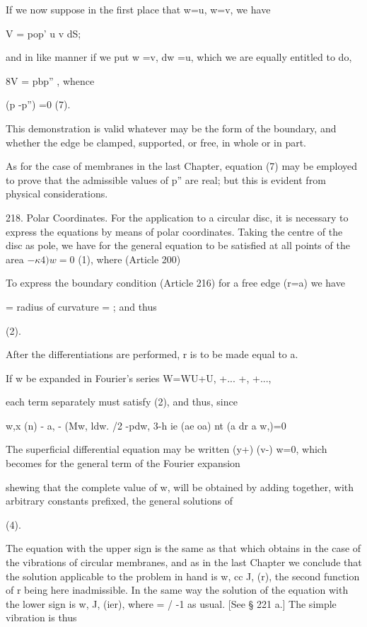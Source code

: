 If we now suppose in the first place that w=u, w=v, we have

V = pop' u v dS;

and in like manner if we put w =v, dw =u, which we are equally entitled
to do,

8V = pbp'' , whence

(p -p'') =0 (7).

This demonstration is valid whatever may be the form of the boundary,
and whether the edge be clamped, supported, or free, in whole or in
part.

As for the case of membranes in the last Chapter, equation (7) may be
employed to prove that the admissible values of p'' are real; but this
is evident from physical considerations.

218. Polar Coordinates.
For the application to a circular disc, it is necessary to express
the equations by means of polar coordinates. Taking the centre of the
disc as pole, we have for the general equation to be satisfied at all
points of the area
\( -\kappa 4) w=0\)
(1), where (Article 200)

To express the boundary condition (Article 216) for a free edge (r=a) we
have

= radius of curvature = ; and thus

(2).

After the differentiations are performed, r is to be made equal to a.

If w be expanded in Fourier's series W=WU+U, +... +, +...,

each term separately must satisfy (2), and thus, since

w,x (n) - a, - (Mw, ldw. /2 -pdw, 3-h ie (ae oa) nt (a dr a w,)=0

The superficial differential equation may be written (y+) (v-) w=0,
which becomes for the general term of the Fourier expansion

shewing that the complete value of w, will be obtained by adding
together, with arbitrary constants prefixed, the general solutions of

(4).

The equation with the upper sign is the same as that which obtains in
the case of the vibrations of circular membranes, and as in the last
Chapter we conclude that the solution applicable to the problem in hand
is w, cc J, (r), the second function of r being here inadmissible. In
the same way the solution of the equation with the lower sign is w, J,
(ier), where = / -1 as usual.
[See § 221 a.]
The simple vibration is thus

